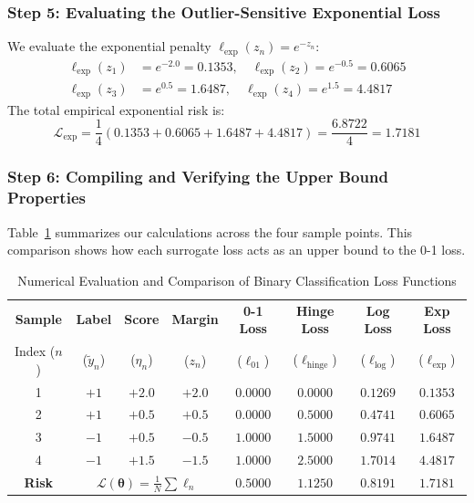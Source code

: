 \documentclass{article}
\begin{document}
\subsubsection{Step 5: Evaluating the Outlier-Sensitive Exponential Loss}
We evaluate the exponential penalty $\ell_{\text{exp}}(z_n) = e^{-z_n}$:
\begin{align*}
\ell_{\text{exp}}(z_1) &= e^{-2.0} = \mathbf{0.1353}, \quad \ell_{\text{exp}}(z_2) = e^{-0.5} = \mathbf{0.6065} \\
\ell_{\text{exp}}(z_3) &= e^{0.5} = \mathbf{1.6487}, \quad \ell_{\text{exp}}(z_4) = e^{1.5} = \mathbf{4.4817}
\end{align*}
The total empirical exponential risk is:
\begin{equation}
\mathcal{L}_{\text{exp}} = \frac{1}{4}(0.1353 + 0.6065 + 1.6487 + 4.4817) = \frac{6.8722}{4} = \mathbf{1.7181}
\end{equation}

\subsubsection{Step 6: Compiling and Verifying the Upper Bound Properties}
Table~\ref{tab:surrogate_comparison} summarizes our calculations across the four sample points. This comparison shows how each surrogate loss acts as an upper bound to the 0-1 loss.

\begin{table}[htbp]
\centering
\small
\setlength{\tabcolsep}{6pt}
\begin{tabular}{|c|c|c|c||c|c|c|c|}
\hline
\textbf{Sample} & \textbf{Label} & \textbf{Score} & \textbf{Margin} & \textbf{0-1 Loss} & \textbf{Hinge Loss} & \textbf{Log Loss} & \textbf{Exp Loss} \\
Index ($n$) & ($\tilde{y}_n$) & ($\eta_n$) & ($z_n$) & ($\ell_{01}$) & ($\ell_{\text{hinge}}$) & ($\ell_{\text{log}}$) & ($\ell_{\text{exp}}$) \\ \hline
1 & $+1$ & $+2.0$ & $+2.0$ & $0.0000$ & $0.0000$ & $0.1269$ & $0.1353$ \\ \hline
2 & $+1$ & $+0.5$ & $+0.5$ & $0.0000$ & $0.5000$ & $0.4741$ & $0.6065$ \\ \hline
3 & $-1$ & $+0.5$ & $-0.5$ & $1.0000$ & $1.5000$ & $0.9741$ & $1.6487$ \\ \hline
4 & $-1$ & $+1.5$ & $-1.5$ & $1.0000$ & $2.5000$ & $1.7014$ & $4.4817$ \\ \hline \hline
\textbf{Risk} & \multicolumn{3}{c||}{$\mathcal{L}(\boldsymbol{\theta}) = \frac{1}{N}\sum \ell_n$} & $\mathbf{0.5000}$ & $\mathbf{1.1250}$ & $\mathbf{0.8191}$ & $\mathbf{1.7181}$ \\ \hline
\end{tabular}
\caption{Numerical Evaluation and Comparison of Binary Classification Loss Functions}
\label{tab:surrogate_comparison}
\end{table}
\end{document}
